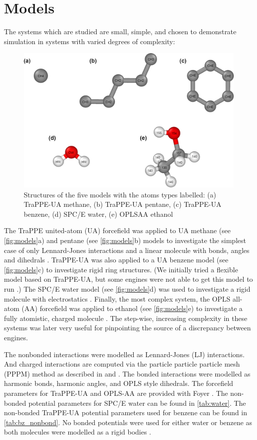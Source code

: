 \section{Models}
The systems which are studied are small, simple, and chosen to demonstrate simulation in systems with varied degrees of complexity:
\begin{figure}[h!]
    \centering
    \includegraphics[width=\linewidth]{figures/rep_study/models.png}
    \caption{Structures of the five models with the atoms types labelled: (a) TraPPE-UA methane, (b) TraPPE-UA pentane, (c) TraPPE-UA benzene, (d) SPC/E water, (e) OPLSAA ethanol}\label{fig:models}
\end{figure}
The TraPPE united-atom (UA) forcefield was applied to UA methane (see \autoref{fig:models}a) and pentane (see \autoref{fig:models}b) models to investigate the simplest case of only Lennard-Jones interactions and a linear molecule with bonds, angles and dihedrals \citep{Martin1998}.
TraPPE-UA was also applied to a UA benzene model (see \autoref{fig:models}c) to investigate rigid ring structures.
(We initially tried a flexible model based on TraPPE-UA, but some engines were not able to get this model to run \citep{Yiannourakou2019}.)
The SPC/E water model (see \autoref{fig:models}d) was used to investigate a rigid molecule with electrostatics \citep{Berendsen1987a}.
Finally, the most complex system, the OPLS all-atom (AA) forcefield was applied to ethanol (see \autoref{fig:models}e) to investigate a fully atomistic, charged molecule \citep{Jorgensen1988}.
The step-wise, increasing complexity in these systems was later very useful for pinpointing the source of a discrepancy between engines.

The nonbonded interactions were modelled as Lennard-Jones (LJ) interactions. 
And charged interactions are computed via the particle particle particle mesh (PPPM) method as described in \citet{Darden1993} and \citet{Lebard2012}. 
The bonded interactions were modelled as harmonic bonds, harmonic angles, and OPLS style dihedrals.
The forcefield parameters for TraPPE-UA and OPLS-AA are provided with Foyer \citep{foyer}. 
The non-bonded potential parameters for SPC/E water can be found in \autoref{tab:water}. 
The non-bonded TraPPE-UA potential parameters used for benzene can be found in \autoref{tab:bz_nonbond}. No bonded potentials were used for either water or benzene as both molecules were modelled as a rigid bodies \citep{Nguyen2011a, Glaser2020a}. 

